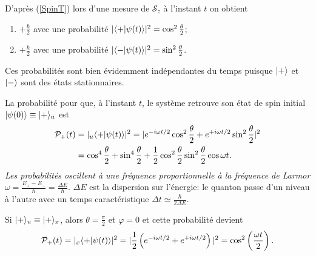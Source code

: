 D'après (\ref{SpinT}) lors d'une mesure de $\mathcal{S}_z$ à l'instant $t$
on obtient

\begin{enumerate}
\item $+\frac{\hbar}{2}$ avec une probabilité $|\langle +\vert\psi(t)\rangle|^{2}
=\cos^{2}\frac{\theta}{2}$;

\item $+\frac{\hbar}{2}$ avec une probabilité $|\langle -\vert\psi(t)\rangle|^{2}
=\sin^{2}\frac{\theta}{2}$.
\end{enumerate}

Ces probabilités sont bien évidemment indépendantes du temps puisque
$\vert+\rangle$ et $\vert-\rangle$ sont des états stationnaires.

La probabilité pour que, à l'instant $t$, le système retrouve son état de spin
initial $\vert\psi(0)\rangle\equiv\vert+\rangle_{u}$ est
\begin{equation}
\begin{split}
\mathcal{P}_{+}(t)&  =|_{u}\bra{+}\psi(t)\rangle|^{2}=|e^{-i\omega
t/2}\cos^{2}\frac{\theta}{2}+e^{+i\omega t/2}\sin^{2}\frac{\theta}{2}|^{2}\\
&  =\cos^{4}\frac{\theta}{2}+\sin^{4}\frac{\theta}{2}+\frac{1}{2}\cos^{2}%
\frac{\theta}{2}\sin^{2}\frac{\theta}{2}\cos\omega t.
\end{split}
\end{equation}
\emph{Les probabilités oscillent à une fréquence proportionnelle à la
fréquence de Larmor} $\omega=\frac{E_{+}-E_{-}}{\hbar}=\frac{\Delta E}{\hbar}$.
$\Delta E$ est la dispersion sur l'énergie: le quanton passe d'un niveau à
l'autre avec un temps caractéristique $\Delta t\simeq\frac{\hbar}{2\Delta E}$.

Si $\vert+\rangle_{u}\equiv\vert+\rangle_{x}$, alors $\theta=\frac{\pi}{2}$ et $\varphi=0$
et cette probabilité devient%
\begin{equation}
\mathcal{P}_{+}(t)=|_{x}\langle+\vert \psi(t)\rangle|^{2}
=|\frac{1}{2}\left(e^{-i\omega t/2}+e^{+i\omega t/2}\right)|^{2}
=\cos^{2}\left( \frac{\omega t}{2}\right).
\end{equation}



